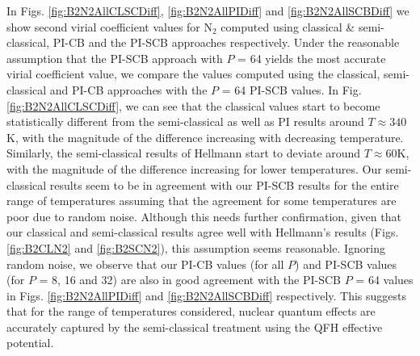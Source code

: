         In Figs. \ref{fig:B2N2AllCLSCDiff}, \ref{fig:B2N2AllPIDiff} and \ref{fig:B2N2AllSCBDiff} we show second virial coefficient values for N$_2$ computed using classical \& semi-classical, PI-CB and the PI-SCB approaches respectively. Under the reasonable assumption that the PI-SCB approach with $P$ = 64 yields the most accurate virial coefficient value, we compare the values computed using the classical, semi-classical and PI-CB approaches with the $P$ = 64 PI-SCB values. In Fig. \ref{fig:B2N2AllCLSCDiff}, we can see that the classical values start to become statistically different from the semi-classical as well as PI results around $T \approx 340$K, with the magnitude of the difference increasing with decreasing temperature. Similarly, the semi-classical results of Hellmann start to deviate around $T \approx 60$K, with the magnitude of the difference increasing for lower temperatures. Our semi-classical results seem to be in agreement with our PI-SCB results for the entire range of temperatures assuming that the agreement for some temperatures are poor due to random noise. Although this needs further confirmation, given that our classical and semi-classical results agree well with Hellmann's results (Figs. \ref{fig:B2CLN2} and \ref{fig:B2SCN2}), this assumption seems reasonable. Ignoring random noise, we observe that our PI-CB values (for all $P$) and PI-SCB values (for $P$ = 8, 16 and 32) are also in good agreement with the PI-SCB $P$ = 64 values in Figs. \ref{fig:B2N2AllPIDiff} and \ref{fig:B2N2AllSCBDiff} respectively. This suggests that for the range of temperatures considered, nuclear quantum effects are accurately captured by the semi-classical treatment using the QFH effective potential.

